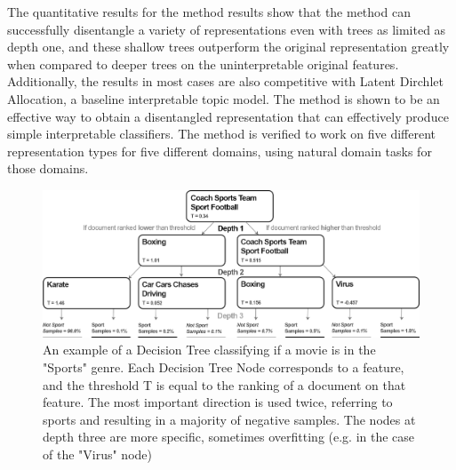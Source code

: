 The quantitative results for the method results show that the method can successfully disentangle a variety of representations even with trees as limited as depth one, and these shallow trees outperform the original representation greatly when compared to deeper trees on the uninterpretable original features. Additionally, the results in most cases are also competitive with Latent Dirchlet Allocation, a baseline interpretable topic model. The method is shown to be an effective way to obtain a disentangled representation that can effectively produce simple interpretable classifiers. The method is verified to work on five different representation types for five different domains, using natural domain tasks for those domains. 

\begin{figure}[t]
	\includegraphics[width=450px]{images/decision_tree_ex.png}
	\centering
	\caption{An example of a Decision Tree classifying if a movie is in the "Sports" genre. Each Decision Tree Node corresponds to a feature, and the threshold T is equal to the ranking of a document on that feature. The most important direction is used twice, referring to sports and resulting in a majority of negative samples. The nodes at depth three are more specific, sometimes overfitting (e.g. in the case of the "Virus" node) }\label{ch3:DecisionTree}
\end{figure}







